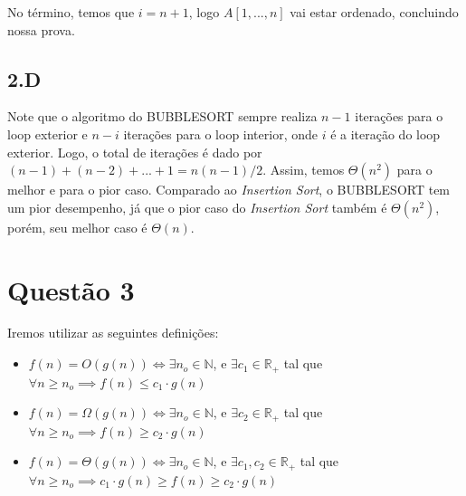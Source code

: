 \documentclass{article}
\begin{document}
No término, temos que $i=n+1$, logo $A[1,...,n]$ vai estar ordenado, concluindo nossa prova.

\subsection*{2.D}
Note que o algoritmo do BUBBLESORT sempre realiza $n-1$ iterações para o loop exterior e $n-i$ iterações
para o loop interior, onde $i$ é a iteração do loop exterior. Logo, o total de iterações é dado por
$(n-1)+(n-2)+...+1 = n(n-1)/2$. Assim, temos $\Theta(n^2)$ para o melhor e
para o pior caso. Comparado ao {\it Insertion Sort}, o BUBBLESORT tem um pior desempenho, já que o pior caso
do {\it Insertion Sort} também é $\Theta(n^2)$, porém, seu melhor caso é $\Theta(n)$.

\section*{Questão 3}
Iremos utilizar as seguintes definições:
\begin{itemize}
      \item $ f(n)=O(g(n))\iff \exists n_o \in \mathbb{N}$, e $\exists c_1 \in \mathbb{R}_+$ tal que $\forall n\geq n_o \implies f(n) \leq c_1 \cdot g(n)$
      \item $ f(n)=\Omega(g(n))\iff\exists n_o \in \mathbb{N}$, e $\exists c_2 \in \mathbb{R}_+$ tal que $\forall n\geq n_o \implies f(n) \geq  c_2 \cdot g(n)$
      \item $ f(n)=\Theta(g(n))\iff\exists n_o \in \mathbb{N}$, e $\exists c_1,c_2 \in \mathbb{R}_+$ tal que
      $\forall n\geq n_o \implies c_1 \cdot g(n) \geq  f(n) \geq  c_2 \cdot g(n)$
  \end{itemize}
\end{document}
